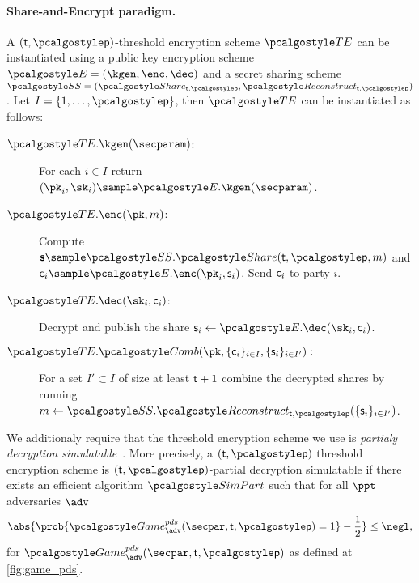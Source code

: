\documentclass[runningheads,10pt]{llncs}
\numberwithin{equation}{section}
\begin{document}
\paragraph{Share-and-Encrypt paradigm.}
A $(\threshold, \noofparties)$-threshold encryption scheme $\TENC$ can be
instantiated using a public key encryption scheme $\ENC = (\kgen, \enc, \dec)$
and a secret sharing scheme $\SS = (\share_{\threshold, \noofparties},
\reconstruct_{\threshold, \noofparties})$. Let $I = \smallset{1, \ldots,
\noofparties}$, then $\TENC$ can be instantiated as follows:
\begin{description}
  \item[$\TENC.\kgen(\secparam)$:] For each $i \in I$ return $(\pk_i, \sk_i)
  \sample \ENC.\kgen(\secparam)$.
  \item[$\TENC.\enc(\vec{\pk}, m)$:] Compute $\vec{\varshare} \sample
  \SS.\share(\threshold, \noofparties, m)$ and $\ciphertext_i \sample
  \ENC.\enc(\pk_i, \varshare_i)$. Send $\mathsf{c}_i$ to party $i$.
  \item[$\TENC.\dec(\sk_i, \ciphertext_i)$:] Decrypt and publish the share
  $\varshare_i \gets \ENC.\dec(\sk_i, \ciphertext_i)$.
  \item[$\TENC.\combine(\vec{\pk}, \smallset{\ciphertext_i}_{i \in I},
  \smallset{\varshare_i}_{i \in I'}):$] For a set $I' \subset I$ of size at
  least $\mathsf{t} + 1$ combine the decrypted shares by running $m \gets
  \SS.\reconstruct_{\threshold, \noofparties}(\smallset{\varshare_i}_{i \in
  I'})$.
\end{description}

We additionaly require that the threshold encryption scheme we use is
\emph{partialy decryption simulatable}~\cite{EPRINT:DGKOS20}. More precisely, a
  $(\threshold, \noofparties)$ threshold encryption scheme is
  $(\threshold, \noofparties)$-partial decryption simulatable if there exists an
  efficient algorithm $\simpart$ such that for all $\ppt$ adversaries $\adv$
  \[
    \abs{\prob{\ngame{\adv}{pds}(\secpar, \threshold, \noofparties) = 1}  -
      \frac{1}{2}} \leq \negl,
  \]
  for $\ngame{\adv}{pds}(\secpar, \threshold, \noofparties)$ as defined at
  \cref{fig:game_pds}.
\end{document}
